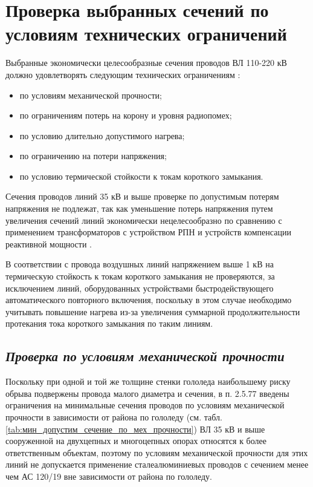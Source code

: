 \section{Проверка выбранных сечений по условиям технических ограничений}

Выбранные экономически целесообразные сечения проводов ВЛ 110-220 кВ должно удовлетворять следующим технических ограничениям \cite{глазунов_шведов}:
\begin{itemize}
	\item по условиям механической прочности;
	\item по ограничениям потерь на корону и уровня радиопомех;
	\item по условию длительно допустимого нагрева;
	\item по ограничению на потери напряжения;
	\item по условию термической стойкости к токам короткого замыкания.
\end{itemize}

Сечения проводов линий 35 кВ и выше проверке по допустимым потерям напряжения не подлежат, так как уменьшение потерь напряжения путем увеличения сечений линий экономически нецелесообразно по сравнению с применением трансформаторов с устройством РПН и устройств компенсации реактивной мощности \cite{файбисович}. 

В соответствии с \cite{пуэ7} провода воздушных линий напряжением выше 1 кВ на термическую стойкость к токам короткого замыкания не проверяются, за исключением линий, оборудованных устройствами быстродействующего автоматического повторного включения, поскольку в этом случае необходимо учитывать повышение нагрева из-за увеличения суммарной продолжительности протекания тока короткого замыкания по таким линиям.

\subsection*{\textit{Проверка по условиям механической прочности}}

Поскольку при одной и той же толщине стенки гололеда наибольшему риску обрыва подвержены провода малого диаметра и сечения, в п. 2.5.77 \cite{пуэ7} введены ограничения на минимальные сечения проводов по условиям механической прочности в зависимости от района по гололеду (см. табл. \ref{tab:мин_допустим_сечение_по_мех_прочности}) ВЛ 35 кВ и выше сооруженной на двухцепных и многоцепных опорах относятся к более ответственным объектам, поэтому по условиям механической прочности для этих линий не допускается применение сталеалюминиевых проводов с сечением менее чем АС 120/19 вне зависимости от района по гололеду.

